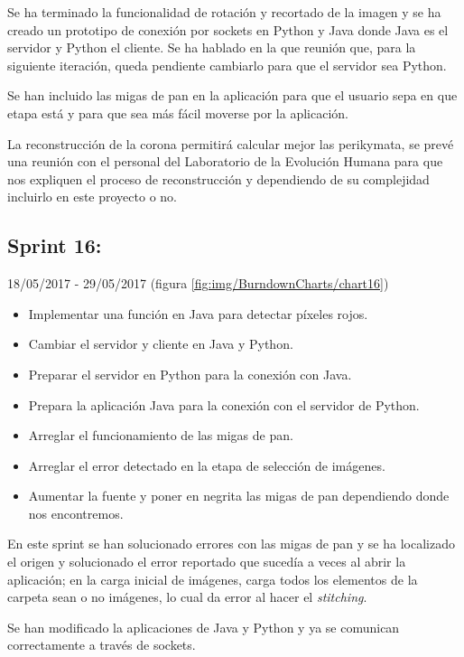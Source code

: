 Se ha terminado la funcionalidad de rotación y recortado de la imagen y se ha creado un prototipo de conexión por sockets en Python y Java donde Java es el servidor y Python el cliente. Se ha hablado en la que reunión que, para la siguiente iteración, queda pendiente cambiarlo para que el servidor sea Python.

Se han incluido las migas de pan en la aplicación para que el usuario sepa en que etapa está y para que sea más fácil moverse por la aplicación.

La reconstrucción de la corona permitirá calcular mejor las perikymata, se prevé una reunión con el personal del Laboratorio de la Evolución Humana para que nos expliquen el proceso de reconstrucción y dependiendo de su complejidad incluirlo en este proyecto o no.

\newpage

\subsection{Sprint 16:}
18/05/2017 - 29/05/2017 (figura \ref{fig:img/BurndownCharts/chart16})
\begin{itemize}
    \item Implementar una función en Java para detectar píxeles rojos.
    \item Cambiar el servidor y cliente en Java y Python.
    \item Preparar el servidor en Python para la conexión con Java.
    \item Prepara la aplicación Java para la conexión con el servidor de Python.
    \item Arreglar el funcionamiento de las migas de pan.
    \item Arreglar el error detectado en la etapa de selección de imágenes.
    \item Aumentar la fuente y poner en negrita las migas de pan dependiendo donde nos encontremos.
\end{itemize}

En este sprint se han solucionado errores con las migas de pan y se ha localizado el origen y solucionado el error reportado que sucedía a veces al abrir la aplicación; en la carga inicial de imágenes, carga todos los elementos de la carpeta sean o no imágenes, lo cual da error al hacer el \textit{stitching}.

Se han modificado la aplicaciones de Java y Python y ya se comunican correctamente a través de sockets.

